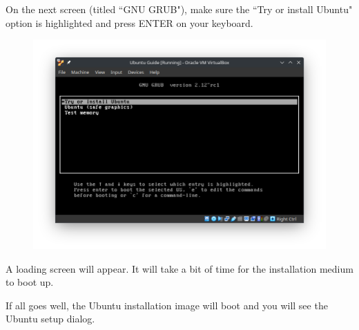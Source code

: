 \documentclass[12pt]{article}
\begin{document}
\pagebreak

On the next screen (titled ``GNU GRUB"), make sure the ``Try or install Ubuntu" option is highlighted and press ENTER on your keyboard.



\begin{figure}[htp]
    \centering
    \includegraphics[width=\textwidth]{1-10.png}
\end{figure}


A loading screen will appear. It will take a bit of time for the installation medium to boot up.



\pagebreak

If all goes well, the Ubuntu installation image will boot and you will see the Ubuntu setup dialog.
\end{document}
